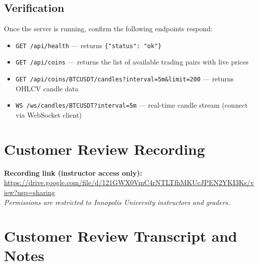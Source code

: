 \documentclass[11pt,a4paper]{article}
\begin{document}
\subsection{Verification}

Once the server is running, confirm the following endpoints respond:

\begin{itemize}
    \item \texttt{GET /api/health} — returns \texttt{\{"status": "ok"\}}
    \item \texttt{GET /api/coins} — returns the list of available trading pairs with live prices
    \item \texttt{GET /api/coins/BTCUSDT/candles?interval=5m\&limit=200} — returns OHLCV candle data
    \item \texttt{WS /ws/candles/BTCUSDT?interval=5m} — real-time candle stream (connect via WebSocket client)
\end{itemize}

\section{Customer Review Recording}


\textbf{Recording link (instructor access only):} \\
\url{https://drive.google.com/file/d/121GWX0VmC4rNTLTfhMKUcJPEN2YKI3Ks/view?usp=sharing} \\
\textit{Permissions are restricted to Innopolis University instructors and graders.}




\section{Customer Review Transcript and Notes}
\end{document}
